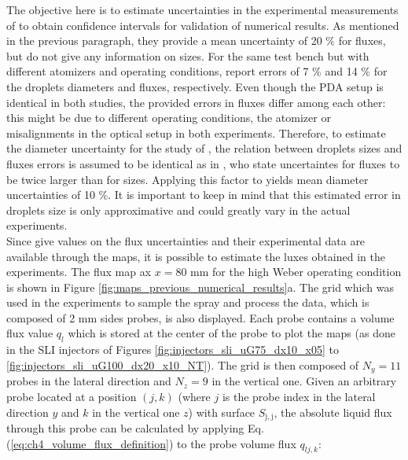 The objective here is to estimate uncertainties in the experimental measurements of  to obtain confidence intervals for validation of numerical results. As mentioned in the previous paragraph, they provide a mean uncertainty of 20 $\%$ for fluxes, but do not give any information on sizes. For the same test bench but with different atomizers and operating conditions,  report errors of 7 $\%$ and 14 $\%$ for the droplets diameters and fluxes, respectively. Even though the PDA setup is identical in both studies, the provided errors in fluxes differ among each other: this might be due to different operating conditions, the atomizer or misalignments in the optical setup in both experiments. Therefore, to estimate the diameter uncertainty for the study of , the relation between droplets sizes and fluxes errors is assumed to be identical as in , who state uncertaintes for fluxes to be twice larger than for sizes. Applying this factor to   yields mean diameter uncertainties of 10 $\%$. It is important to keep in mind that this estimated error in droplets size is only approximative and could greatly vary in the actual experiments. \\ %

Since  give values on the flux uncertainties and their experimental data are available through the maps, it is possible to estimate the luxes obtained in the experiments. The flux map ax $x = 80$ mm for the high Weber operating condition is shown in Figure \ref{fig:maps_previous_numerical_results}a. The grid which was used in the experiments to sample the spray and process the data, which is composed of 2 mm sides probes, is also displayed. Each probe contains a volume flux value $q_l$ which is stored at the center of the probe to plot the maps (as done in the SLI injectors of Figures 
\ref{fig:injectors_sli_uG75_dx10_x05} to \ref{fig:injectors_sli_uG100_dx20_x10_NT}). The grid is then composed of $N_y = 11$ probes in the lateral direction and $N_z = 9$ in the vertical one. Given an arbitrary probe located at a position $\left( j,k \right)$ (where $j$ is the probe index in the lateral direction $y$ and $k$ in the vertical one $z$) with surface $S_\mathrm{j,j}$, the absolute liquid flux through this probe can be calculated by applying Eq. (\ref{eq:ch4_volume_flux_definition}) to the probe volume flux $q_{l{j,k}}$:

